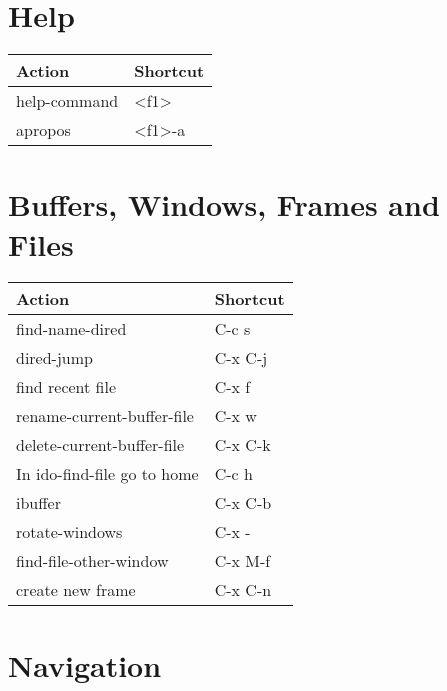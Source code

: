 \documentclass[english]{rcalibritwocolumn}
\title{\color{statblue}{Emacs Shortcuts}}
\author{\color{statblue}Ronert Obst}
\date{\color{statblue}\today}
\begin{document}
\maketitle

\setcounter{tocdepth}{3}
\tableofcontents
\vspace*{1cm}
\section{Help}
\label{sec-1}


\begin{center}
\begin{tabular}{ll}
 \textbf{Action}  &  \textbf{Shortcut}  \\
\hline
 help-command     &  <f1>               \\
 apropos          &  <f1>-a             \\
\end{tabular}
\end{center}
\section{Buffers, Windows, Frames and Files}
\label{sec-2}


\begin{center}
\begin{tabular}{ll}
 \textbf{Action}              &  \textbf{Shortcut}  \\
\hline
 find-name-dired              &  C-c s              \\
 dired-jump                   &  C-x C-j            \\
 find recent file             &  C-x f              \\
 rename-current-buffer-file   &  C-x w              \\
 delete-current-buffer-file   &  C-x C-k            \\
 In ido-find-file go to home  &  C-c h              \\
\hline
 ibuffer                      &  C-x C-b            \\
\hline
 rotate-windows               &  C-x -              \\
 find-file-other-window       &  C-x M-f            \\
\hline
 create new frame             &  C-x C-n            \\
\end{tabular}
\end{center}
\section{Navigation}
\label{sec-3}
\end{document}
